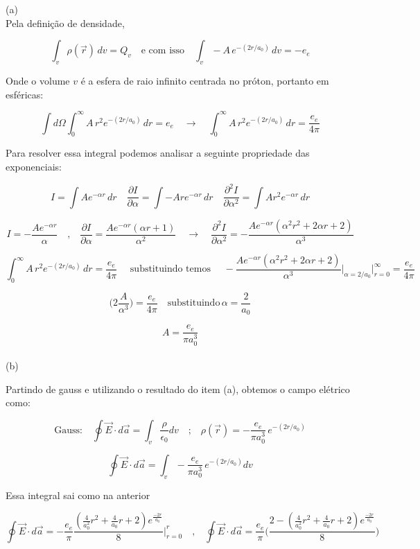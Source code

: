 \documentclass[a4paper,11pt]{exam}
\begin{document}
{	\normalsize
	(a)\\
	\indent Pela definição de densidade,

	\[ \int_v \rho(\vec{r})\, dv = Q_v \quad \text{e com isso} \quad \int_{v} -A \, e^{-(2r/a_{0})} \, dv = -e_e \]

	\indent Onde o volume $v$ é a esfera de raio infinito centrada no próton, portanto em esféricas:

	\[ \int d\Omega \int_{0}^{\infty} A \, r^2 e^{-(2r/a_{0})} \, dr = e_e \quad \to \quad \int_{0}^{\infty} A \, r^2 e^{-(2r/a_{0})} \, dr = \frac{e_e}{4\pi}\]

	\indent Para resolver essa integral podemos analisar a seguinte propriedade das exponenciais:

	\[ I = \int A e^{-\alpha r} \, dr \quad \frac{\partial I}{\partial \alpha} = \int -A r e^{-\alpha r} \, dr \quad \frac{\partial^2 I}{\partial \alpha^2} =\int A r^2 e^{-\alpha r} \, dr\]
	
	\[I = -\frac{Ae^{-\alpha r}}{\alpha} \quad \text{,} \quad \frac{\partial I}{\partial \alpha} = \frac{Ae^{-\alpha r} (\alpha r + 1)}{\alpha^2} \quad \to \quad\frac{\partial^2 I}{\partial \alpha^2} = -\frac{Ae^{-\alpha r}(\alpha^2 r^2 + 2\alpha r + 2)}{\alpha^3} \]

	\[\int_{0}^{\infty} A \, r^2 e^{-(2r/a_{0})} \, dr = \frac{e_e}{4\pi} \quad \text{ substituindo temos } \quad -\frac{Ae^{-\alpha r}(\alpha^2 r^2 + 2\alpha r + 2)}{\alpha^3}\Big|_{\alpha=2/a_0}\Bigg|_{r=0}^{\infty} = \frac{e_e}{4\pi} \]

	\[\Bigg( 2\frac{A}{\alpha^3}\Bigg) = \frac{e_e}{4\pi} \quad \text{substituindo}\,\alpha=\frac{2}{a_0}\]

	\[ A = \frac{e_e}{\pi a_0^3 } \]
	\\
	(b)

	\indent Partindo de gauss e utilizando o resultado do item (a), obtemos o campo elétrico como:

	\[ \text{Gauss:} \quad \oint \vec{E} \cdot d\vec{a} = \int_v \frac{\rho}{\epsilon_0} dv \quad \text{;} \quad \rho(\vec{r}) = -\frac{e_e}{\pi a_0^3 } \, e^{-(2r/a_{0})}\]

	\[\oint \vec{E} \cdot d\vec{a} = \int_v -\frac{e_e}{\pi a_0^3 } \, e^{-(2r/a_{0})}dv\]

	\indent Essa integral sai como na anterior

	\[\oint \vec{E} \cdot d\vec{a} = -\frac{e_e}{\pi} \frac{(\frac{4}{a_0^2} r^2 + \frac{4}{a_0} r + 2) e^{\frac{-2r }{a_0} }}{8}\Bigg|_{r=0}^{r} \quad \text{,} \quad \oint \vec{E} \cdot d\vec{a} = \frac{e_e}{\pi} \Bigg( \frac{2-(\frac{4}{a_0^2} r^2 + \frac{4}{a_0} r + 2) e^{\frac{-2r }{a_0} }}{8} \Bigg) \]

}
\end{document}
